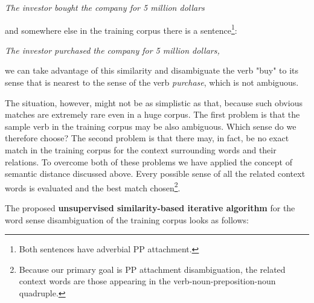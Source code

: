 \begin{center}
\it The investor bought the company for 5 million dollars
\end{center}

and somewhere else in the training corpus there is a sentence\footnote{Both sentences have adverbial PP attachment.}:

\begin{center}
\it The investor purchased the company for 5 million dollars,
\end{center}

we can take advantage of this similarity and disambiguate the verb "buy" to its sense that is nearest to the sense of the verb {\it purchase}, which is not ambiguous. 

The situation, however, might not be as simplistic as that, because such obvious matches are extremely rare even in a huge corpus. The first problem is that the sample verb in the training corpus may be also ambiguous. Which sense do we therefore choose? The second problem is that there may, in fact, be no exact match in the training corpus for the context surrounding words and their relations. To overcome both of these problems we have applied the concept of semantic distance discussed above. Every possible sense of all the related context words is evaluated and the best match chosen\footnote{Because our primary goal is PP attachment disambiguation, the related context words are those appearing in the verb-noun-preposition-noun quadruple.}.

The proposed {\bf unsupervised similarity-based iterative algorithm} for the word sense disambiguation of the training corpus looks as follows:

